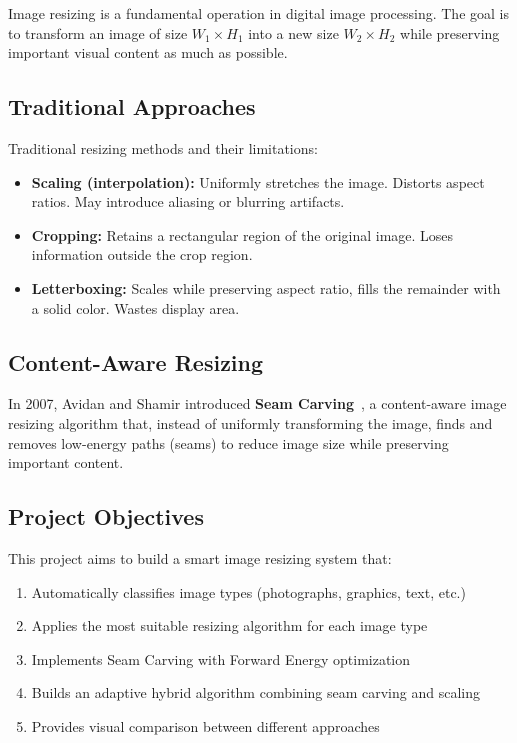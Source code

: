 \documentclass[12pt,a4paper]{article}
\begin{document}
Image resizing is a fundamental operation in digital image processing. The goal is to transform an image of size $W_1 \times H_1$ into a new size $W_2 \times H_2$ while preserving important visual content as much as possible.

\subsection{Traditional Approaches}

Traditional resizing methods and their limitations:

\begin{itemize}
    \item \textbf{Scaling (interpolation):} Uniformly stretches the image. Distorts aspect ratios. May introduce aliasing or blurring artifacts.
    \item \textbf{Cropping:} Retains a rectangular region of the original image. Loses information outside the crop region.
    \item \textbf{Letterboxing:} Scales while preserving aspect ratio, fills the remainder with a solid color. Wastes display area.
\end{itemize}

\subsection{Content-Aware Resizing}

In 2007, Avidan and Shamir introduced \textbf{Seam Carving}~\cite{avidan2007}, a content-aware image resizing algorithm that, instead of uniformly transforming the image, finds and removes low-energy paths (seams) to reduce image size while preserving important content.

\subsection{Project Objectives}

This project aims to build a smart image resizing system that:

\begin{enumerate}
    \item Automatically classifies image types (photographs, graphics, text, etc.)
    \item Applies the most suitable resizing algorithm for each image type
    \item Implements Seam Carving with Forward Energy optimization
    \item Builds an adaptive hybrid algorithm combining seam carving and scaling
    \item Provides visual comparison between different approaches
\end{enumerate}
\end{document}
